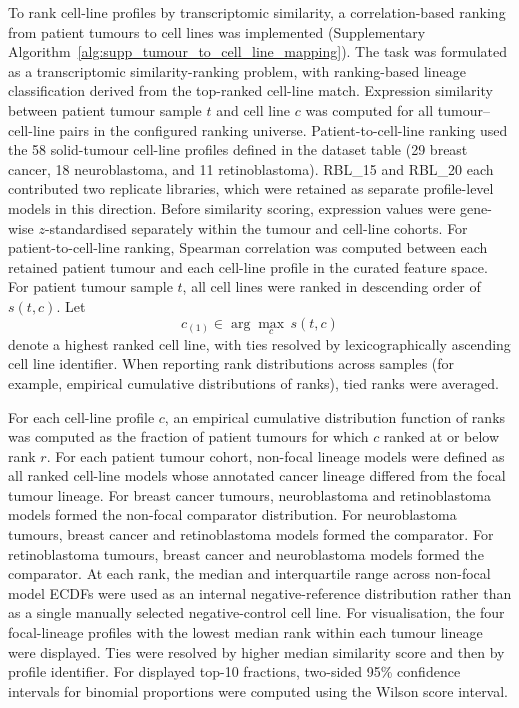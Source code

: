 To rank cell-line profiles by transcriptomic similarity, a correlation-based
ranking from patient tumours to cell lines was implemented (Supplementary
Algorithm~\ref{alg:supp_tumour_to_cell_line_mapping}).
The task was formulated as a transcriptomic similarity-ranking problem, with
ranking-based lineage classification derived from the top-ranked cell-line
match. Expression similarity between patient tumour sample $t$
and cell line $c$ was computed for all tumour--cell-line pairs in the configured ranking universe.
Patient-to-cell-line ranking used the 58 solid-tumour cell-line profiles
defined in the dataset table (29 breast cancer, 18 neuroblastoma, and 11
retinoblastoma). RBL\_15 and RBL\_20 each contributed two replicate libraries,
which were retained as separate profile-level models in this direction.
Before similarity scoring, expression values were gene-wise \(z\)-standardised separately within the tumour and cell-line cohorts.
For patient-to-cell-line ranking, Spearman correlation was computed between each retained patient tumour and each cell-line profile in the curated feature space.
For patient tumour sample $t$, all cell lines were ranked in descending order of $s(t,c)$.
Let
\[
c_{(1)} \in \arg\max_{c} \, s(t,c)
\]
denote a highest ranked cell line, with ties resolved by lexicographically ascending cell line identifier.
When reporting rank distributions across samples (for example, empirical cumulative distributions of ranks), tied ranks were averaged.

For each cell-line profile \(c\), an empirical cumulative distribution function
of ranks was computed as the fraction of patient tumours for which \(c\) ranked
at or below rank \(r\). For each patient tumour cohort, non-focal lineage models
were defined as all ranked cell-line models whose annotated cancer lineage
differed from the focal tumour lineage. For breast cancer tumours,
neuroblastoma and retinoblastoma models formed the non-focal comparator
distribution. For neuroblastoma tumours, breast cancer and retinoblastoma models
formed the comparator. For retinoblastoma tumours, breast cancer and
neuroblastoma models formed the comparator. At each rank, the median and
interquartile range across non-focal model ECDFs were used as an internal
negative-reference distribution rather than as a single manually selected
negative-control cell line. For visualisation, the four focal-lineage profiles
with the lowest median rank within each tumour lineage were displayed. Ties
were resolved by higher median similarity score and then by profile identifier.
For displayed top-10 fractions, two-sided 95\% confidence intervals for
binomial proportions were computed using the Wilson score interval.

